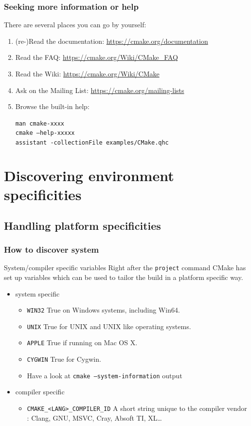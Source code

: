 \documentclass[compress,slidestop,table,usepdftitle=false
              ]
               {beamer}
\newcommand{\fname}[1]{\texttt{#1}}
\begin{document}
\begin{frame}[fragile]
\frametitle{Seeking more information or help}
There are several places you can go by yourself:
\begin{enumerate}
\item {\tiny(re-)}Read the documentation: \url{https://cmake.org/documentation}
\item Read the FAQ: \url{https://cmake.org/Wiki/CMake_FAQ}
\item Read the Wiki: \url{https://cmake.org/Wiki/CMake}
\item Ask on the Mailing List: \url{https://cmake.org/mailing-lists}
\item Browse the built-in help:

     \fname{man cmake-xxxx}\\
     \fname{cmake --help-xxxxx}\\
     \fname{assistant -collectionFile examples/CMake.qhc}
\end{enumerate}
\end{frame}

\section{Discovering environment specificities}
\subsection{Handling platform specificities}
\begin{frame}[fragile]
\frametitle{How to discover system}
\begin{block}{System/compiler specific variables}
Right after the \lstinline!project! command CMake has set up variables which can be used to tailor
the build in a platform specific way.
\end{block}
\lstset{basicstyle=\small}
\begin{itemize}
\item system specific
\begin{itemize}
\item \lstinline!WIN32! True on Windows systems, including Win64.
\item \lstinline!UNIX! True for UNIX and UNIX like operating systems.
\item \lstinline!APPLE! True if running on Mac OS X.
\item \lstinline!CYGWIN! True for Cygwin.
\item Have a look at \fname{cmake --system-information} output
\end{itemize}
\item compiler specific
\begin{itemize}
\item \lstinline!CMAKE_<LANG>_COMPILER_ID! A short string unique to the compiler vendor : Clang, GNU, MSVC, Cray, Absoft TI, XL\ldots
\end{itemize}
\end{itemize}
\lstset{basicstyle=\normalsize}
\end{frame}
\end{document}
